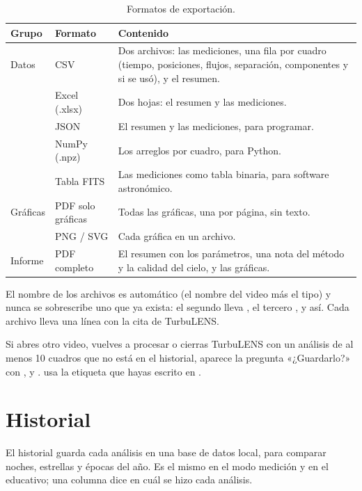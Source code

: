 \begin{table}[H]
\centering\small
\begin{tabularx}{\linewidth}{@{}l l Y@{}}
\toprule
Grupo & Formato & Contenido\\
\midrule
Datos & CSV & Dos archivos: las mediciones, una fila por cuadro (tiempo, posiciones, flujos, separación, componentes y si se usó), y el resumen.\\
 & Excel (.xlsx) & Dos hojas: el resumen y las mediciones.\\
 & JSON & El resumen y las mediciones, para programar.\\
 & NumPy (.npz) & Los arreglos por cuadro, para Python.\\
 & Tabla FITS & Las mediciones como tabla binaria, para software astronómico.\\
Gráficas & PDF solo gráficas & Todas las gráficas, una por página, sin texto.\\
 & PNG / SVG & Cada gráfica en un archivo.\\
Informe & PDF completo & El resumen con los parámetros, una nota del método y la calidad del cielo, y las gráficas.\\
\bottomrule
\end{tabularx}
\caption{Formatos de exportación.}
\end{table}

El nombre de los archivos es automático (el nombre del video más el tipo) y nunca se sobrescribe uno que ya exista: el
segundo lleva , el tercero , y así. Cada archivo lleva una línea con la cita de TurbuLENS.

\begin{nota}
Si abres otro video, vuelves a procesar o cierras TurbuLENS con un análisis de al menos 10 cuadros que no está en el
historial, aparece la pregunta «¿Guardarlo?» con ,  y . 
usa la etiqueta que hayas escrito en .
\end{nota}

\section{Historial}\label{sec:historial}

El historial guarda cada análisis en una base de datos local, para comparar noches, estrellas y épocas del año. Es el
mismo en el modo medición y en el educativo; una columna dice en cuál se hizo cada análisis.

